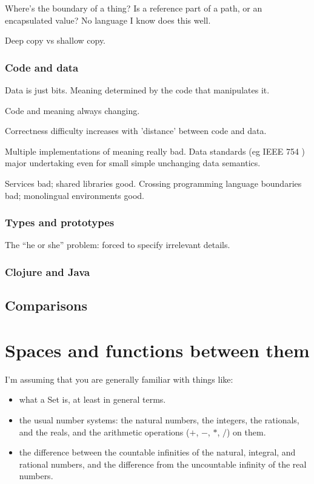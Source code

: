 \documentclass[10pt,openany]{book}
\begin{document}
Where's the boundary of a thing? 
Is a reference part of a path, or
an encapsulated value?
No language I know does this well.

Deep copy vs shallow copy.


\section{Code and data}

Data is just bits. 
Meaning determined by the code that manipulates it. 

Code and meaning always changing.

Correctness difficulty increases
with 'distance' between code and data. 

Multiple implementations of meaning really bad.
Data standards (eg IEEE 754 \cite{Higham2002ASNA, IEEE:1985:AIS,
P754:2008:ISF, Muller-et-al-2010}) major undertaking even for
small simple unchanging data semantics.

Services bad; shared libraries good.
Crossing programming language boundaries bad; 
monolingual environments \cite{Heering:1985:TMP:3318.3321} good.

\section{Types and prototypes}

The ``he or she'' problem: forced to specify irrelevant details.




\section{Clojure and Java}

\chapter{Comparisons}

\part{Spaces and functions between them}

I'm assuming that you are generally familiar with things like:
\begin{itemize}
  \item what a \gls{Set} is, at least in general terms.
  \item the usual number systems: 
the natural numbers, the integers, the rationals, and the reals, 
and the arithmetic operations ($+$, $-$, $*$, $/$) on them.
\item the difference between the
countable infinities of the natural, integral, and rational numbers,
and the difference from the uncountable infinity of the real numbers.
\end{itemize} 
\end{document}
